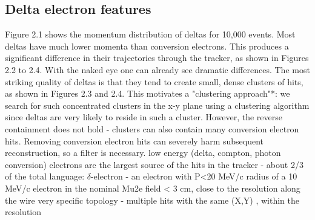 \subsection{Delta electron features}








Figure 2.1 shows the momentum distribution of deltas for 10,000 events.
Most deltas have much lower momenta than conversion electrons. This produces a significant
difference in their trajectories through the tracker, as shown in Figures 2.2 to 2.4. With the naked eye
one can already see dramatic differences.
The most striking quality of deltas is that they tend to create small, dense clusters of hits, as
shown in Figures 2.3 and 2.4. This motivates a "clustering approach"*: we search for such
concentrated clusters in the x-y plane using a clustering algorithm since deltas are very likely to reside
in such a cluster. However, the reverse containment does not hold - clusters can also contain many
conversion electron hits. Removing conversion electron hits can severely harm subsequent
reconstruction, so a filter is necessary. 
low energy (delta, compton, photon conversion) electrons are the largest source of the hits
in the tracker - about 2/3 of the total
language: $\delta$-electron - an electron with P<20 MeV/c
radius of a 10 MeV/c electron in the nominal Mu2e field < 3 cm, close to the resolution
along the wire
very specific topology - multiple hits with the same (X,Y) , within the resolution
\fi